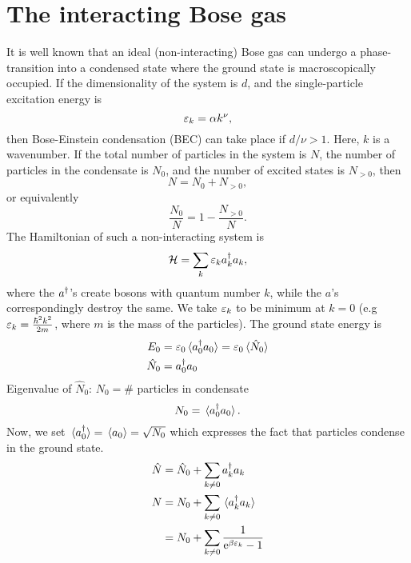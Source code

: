 \section{The interacting Bose gas}

It is well known that an ideal (non-interacting) Bose gas can undergo a phase-transition into a condensed state where the ground state is macroscopically occupied. If the dimensionality of the system is \emph{$d$}, and the single-particle excitation energy is
\begin{equation}
	\varepsilon_k = \alpha k^\nu,
\end{equation}
then Bose-Einstein condensation (BEC) can take place if $d/\nu > 1$. 
Here, $k$ is a wavenumber. If the total number of particles in the system is $N$, the number of particles in the condensate is $N_0$, and the number of excited states is $N_{>0}$, then 
\begin{equation}
	N = N_0 +N_{>0},
\end{equation}
or equivalently
\begin{equation}
	\frac{N_0}{N} = 1 - \frac{N_{>0}}{N}.
\end{equation}
The Hamiltonian of such a non-interacting system is
\begin{equation}
	\mathcal{H} = \sum_{k}\varepsilon_k a_{k}^{\dagger}a_{k},
\end{equation}
where the $a^{\dagger}$'s create bosons with quantum number  $k$, while the $a$'s correspondingly destroy the same. We take $\varepsilon_k$ to be minimum at $k=0$ (e.g $\varepsilon_k = \frac{\hbar^2k^2}{2m}$, where $m$ is the mass of the particles).
The ground state energy is 
\begin{align}
	E_0 &= \ep_0\ev*{a_{0}^{\dg}a_{0}} = \ep_0\ev*{\hat{N}_{0}} \\
	\hat{N}_{0} &= a_{0}^{\dg}a_{0}
\end{align}
Eigenvalue of $	\hat{N}_{0}$: $N_0 = \#$  particles in condensate
\begin{equation}
	N_0 = \ev*{a_{0}^{\dg}a_{0}}.
\end{equation}
Now, we set $\ev*{a_0^{\dg}} = \ev*{a_0} = \sqrt{N_0}$ which expresses the fact that particles condense in the ground state. 
\begin{align}
	\hat{N} &= \hat{N}_0 + \sum_{k\ne0}a_{k}^{\dg}a_{k} \\
	N&= N_0 + \sum_{k\ne0}\ev*{a_{k}^{\dg}a_{k}} \nonumber \\
	&= N_0 + \sum_{k\ne0}\frac{1}{\e^{\beta\ep_k}-1}
\end{align}

